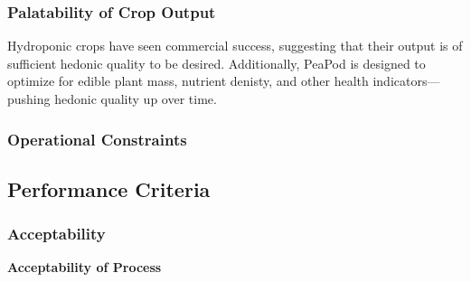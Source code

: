 \documentclass{report}
\begin{document}

\subsubsection{Palatability of Crop Output} 




Hydroponic crops have seen commercial success, suggesting that their output is of sufficient hedonic quality to be desired. Additionally, PeaPod is designed to optimize for edible plant mass, nutrient denisty, and other health indicators---pushing hedonic quality up over time.

\subsubsection{Operational Constraints} 


 
\newpage

\subsection{Performance Criteria}


\subsubsection{Acceptability}

\textbf{Acceptability of Process}
\end{document}
